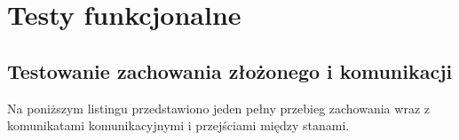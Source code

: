 %


\section{Testy funkcjonalne}


\subsection{Testowanie zachowania złożonego i komunikacji}

Na poniższym listingu przedstawiono jeden pełny przebieg zachowania wraz z komunikatami komunikacyjnymi i przejściami między stanami.



